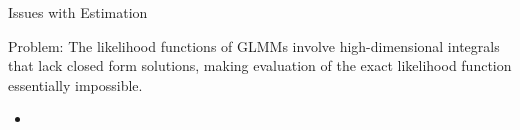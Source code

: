 \documentclass{beamer}\usepackage[]{graphicx}\usepackage[]{color}
\begin{document}
\begin{frame}{Issues with Estimation}
	
	 \begin{block}{Problem:}
      The likelihood functions of GLMMs involve high-dimensional integrals that lack closed form solutions, making evaluation of the exact likelihood function essentially impossible. 
   \end{block}
	
	\begin{itemize}
		\item  \pause
	\end{itemize}
	
	
\end{frame}
\end{document}
